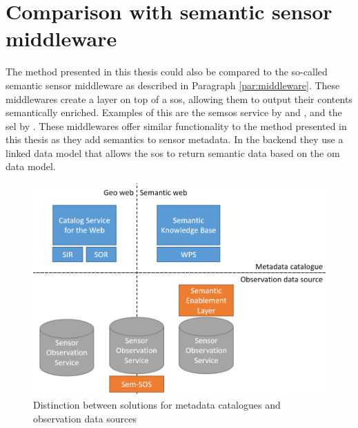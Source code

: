 \section{Comparison with semantic sensor middleware}
The method presented in this thesis could also be compared to the so-called semantic sensor middleware as described in Paragraph \ref{par:middleware}. These middlewares create a layer on top of a \ac{sos}, allowing them to output their contents semantically enriched. Examples of this are the \acf{semsos} service by \cite{SSW:Henson} and \cite{SSW:Pschorr}, and the \acf{sel} by \cite{SSW:Janowicz}. These middlewares offer similar functionality to the method presented in this thesis as they add semantics to sensor metadata. In the backend they use a linked data model that allows the \ac{sos} to return semantic data based on the \ac{om} data model. 

\begin{figure}
	\centering
	\includegraphics[width=0.8\linewidth]{figs/catalogVSsource2.PNG}
	\caption{Distinction between solutions for metadata catalogues and observation data sources}
	\label{fig:catVSsource}
\end{figure}


